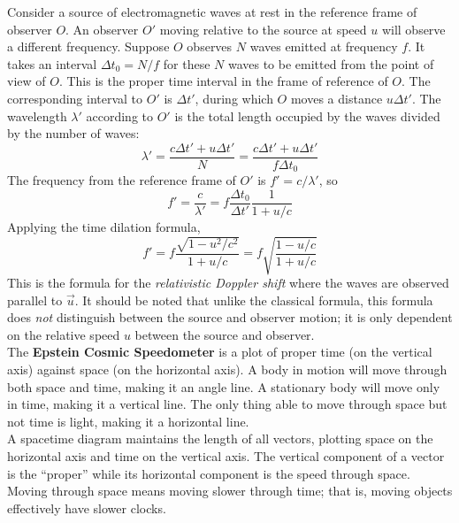 \documentclass{subfiles}
\begin{document}
			Consider a source of electromagnetic waves at rest in the reference frame of observer \(O\). An observer \(O'\) moving relative to the source at speed \(u\) will observe a different frequency. Suppose \(O\) observes \(N\) waves emitted at frequency \(f\). It takes an interval \(\Delta t_0 = N/f\) for these \(N\) waves to be emitted from the point of view of \(O\). This is the proper time interval in the frame of reference of \(O\). The corresponding interval to \(O'\) is \(\Delta t'\), during which \(O\) moves a distance \(u\Delta t'\). The wavelength \(\lambda'\) according to \(O'\) is the total length occupied by the waves divided by the number of waves:
				\[
					\lambda' = \frac{c\Delta t' + u\Delta t'}{N}
						= \frac{c\Delta t' + u\Delta t'}{f\Delta t_0}
				\]
				The frequency from the reference frame of \(O'\) is \(f' = c/\lambda'\), so
				\[
					f' = \frac{c}{\lambda'}
						= f\frac{\Delta t_0}{\Delta t'}\frac{1}{1 + u/c}
				\]
				Applying the time dilation formula,
				\[
					f' = f\frac{\sqrt{1 - u^2/c^2}}{1 + u/c}
						= f\sqrt{\frac{1 - u/c}{1 + u/c}} \tag{relativistic Doppler shift}
				\]
				This is the formula for the \textit{relativistic Doppler shift} where the waves are observed parallel to \(\vec{u}\). It should be noted that unlike the classical formula, this formula does \textit{not} distinguish between the source and observer motion; it is only dependent on the relative speed \(u\) between the source and observer. \\
		The \textbf{Epstein Cosmic Speedometer} is a plot of proper time (on the vertical axis) against space (on the horizontal axis). A body in motion will move through both space and time, making it an angle line. A stationary body will move only in time, making it  a vertical line. The only thing able to move through space but not time is light, making it a horizontal line. \\
		A spacetime diagram maintains the length of all vectors, plotting space on the horizontal axis and time on the vertical axis. The vertical component of a vector is the \enquote{proper} while its horizontal component is the speed through space. \\
		Moving through space means moving slower through time; that is, moving objects effectively have slower clocks.
\end{document}
